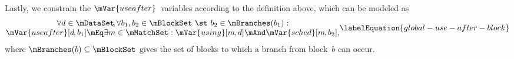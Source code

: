 Lastly, we constrain the $\mVar{useafter}$~\glspl{variable} according to the
definition above, which can be modeled as
%
\begin{equation}
  \begin{array}{@{}c@{}}
    \forall d \in \mDataSet \!,
    \forall b_1, b_2 \in \mBlockSet
    \text{ \st }
    b_2 \in \mBranches(b_1) : \\
    \mVar{useafter}[d \hspace{-1pt}, b_1]
    \mEq
    \exists m \in \mMatchSet :
    \mVar{using}[m \hspace{-1pt}, d]
    \mAnd
    \mVar{sched}[m \hspace{-1pt}, b_2],
  \end{array}
  \labelEquation{global-use-after-block}
\end{equation}
%
where \mbox{$\mBranches(b) \subseteq \mBlockSet$} gives the set of \glspl{block}
to which a branch from \gls{block}~$b$ can occur.
